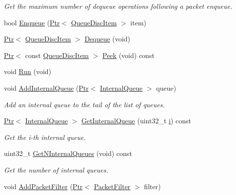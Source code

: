 \begin{DoxyCompactItemize}
\begin{DoxyCompactList}\small\item\em Get the maximum number of dequeue operations following a packet enqueue. \end{DoxyCompactList}\item 
bool \hyperlink{classns3_1_1QueueDisc_af452fb01b98fed312125163f1fe85431}{Enqueue} (\hyperlink{classns3_1_1Ptr}{Ptr}$<$ \hyperlink{classns3_1_1QueueDiscItem}{Queue\+Disc\+Item} $>$ item)
\item 
\hyperlink{classns3_1_1Ptr}{Ptr}$<$ \hyperlink{classns3_1_1QueueDiscItem}{Queue\+Disc\+Item} $>$ \hyperlink{classns3_1_1QueueDisc_a6c13fc489822c1487f61c2289f2e3629}{Dequeue} (void)
\item 
\hyperlink{classns3_1_1Ptr}{Ptr}$<$ const \hyperlink{classns3_1_1QueueDiscItem}{Queue\+Disc\+Item} $>$ \hyperlink{classns3_1_1QueueDisc_a952cddf7fbe32e180a170a7be21875fa}{Peek} (void) const 
\item 
void \hyperlink{classns3_1_1QueueDisc_a424eceba41cb013436f353c622c082ff}{Run} (void)
\item 
void \hyperlink{classns3_1_1QueueDisc_a0599223e2a3976ef042a56c2923a2b61}{Add\+Internal\+Queue} (\hyperlink{classns3_1_1Ptr}{Ptr}$<$ \hyperlink{classns3_1_1QueueDisc_a3acb7d460465f9f13c6fbbdeae7508f8}{Internal\+Queue} $>$ queue)
\begin{DoxyCompactList}\small\item\em Add an internal queue to the tail of the list of queues. \end{DoxyCompactList}\item 
\hyperlink{classns3_1_1Ptr}{Ptr}$<$ \hyperlink{classns3_1_1QueueDisc_a3acb7d460465f9f13c6fbbdeae7508f8}{Internal\+Queue} $>$ \hyperlink{classns3_1_1QueueDisc_adf09b498c07c5677c26ea4b8309def74}{Get\+Internal\+Queue} (uint32\+\_\+t \hyperlink{lte__uplink__power__control_8m_a6f6ccfcf58b31cb6412107d9d5281426}{i}) const 
\begin{DoxyCompactList}\small\item\em Get the i-\/th internal queue. \end{DoxyCompactList}\item 
uint32\+\_\+t \hyperlink{classns3_1_1QueueDisc_a98e658dc1b0b32104ffc9e07afd205c6}{Get\+N\+Internal\+Queues} (void) const 
\begin{DoxyCompactList}\small\item\em Get the number of internal queues. \end{DoxyCompactList}\item 
void \hyperlink{classns3_1_1QueueDisc_a45efdc512f64cb8e0d57ad4f208ed4b7}{Add\+Packet\+Filter} (\hyperlink{classns3_1_1Ptr}{Ptr}$<$ \hyperlink{classns3_1_1PacketFilter}{Packet\+Filter} $>$ filter)

\end{DoxyCompactItemize}
